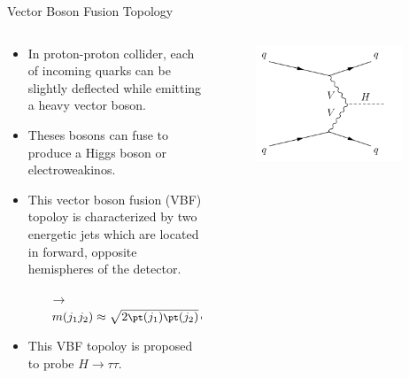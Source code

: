 \begin{frame}[fragile]{Vector Boson Fusion Topology}
  \begin{columns}
    \begin{column}{0.6\textwidth}
      \begin{itemize}
        \item In proton-proton collider, each of incoming quarks can be slightly deflected while emitting a heavy vector boson.
        \item Theses bosons can fuse to produce a Higgs boson or electroweakinos.
        \item This vector boson fusion (VBF) topoloy is characterized by two energetic jets which are located in forward, opposite hemispheres of the detector. 
        \begin{itemize}
          \item[\(\rightarrow\)] \({\footnotesize m(j_{1}j_{2}) \approx \sqrt{2\pt(j_{1})\pt(j_{2})}\cosh{\abs{\eta(j_{1}) - \eta(j_{2})}} }\)
        \end{itemize}
        \item This VBF topoloy is proposed to probe \(H\to\tau\tau\).
      \end{itemize}
    \end{column}

    \begin{column}{0.4\textwidth}
      \begin{figure}[htpb]
        \centering
        \includegraphics[width=0.9\textwidth]{fig/VectorBosonFusion.png}
      \end{figure}
    \end{column}
  \end{columns}

\end{frame}

